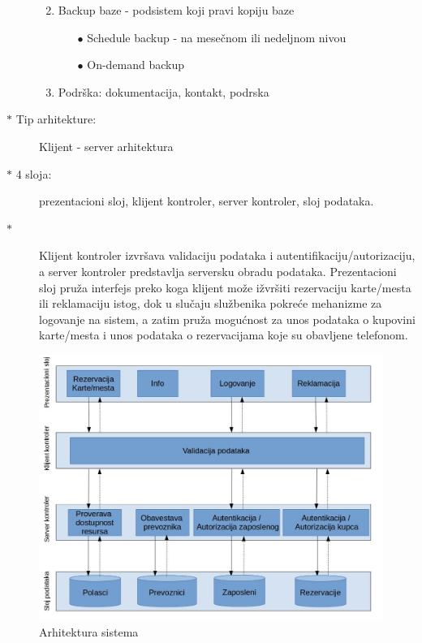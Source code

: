 \begin{description}
\begin{enumerate}
\begin{enumerate}
				\end{enumerate}
			\item Backup baze - podsistem koji pravi kopiju baze
				\begin{enumerate}
					\item[$\bullet$] Schedule backup - na mese\v cnom ili nedeljnom nivou
					\item[$\bullet$] On-demand backup
				\end{enumerate}
			\item Podr\v ska: dokumentacija, kontakt, podrska
		\end{enumerate}
	\item[$\ast$ Tip arhitekture:] Klijent - server arhitektura
	\item[$\ast$ 4 sloja:] prezentacioni sloj, klijent kontroler, server kontroler, sloj podataka. 
	\item[$\ast$] Klijent kontroler izvr\v sava validaciju podataka i autentifikaciju/autorizaciju, a server kontroler predstavlja serversku obradu podataka. Prezentacioni sloj pru\v za interfejs preko koga klijent mo\v ze i\v zvr\v siti rezervaciju karte/mesta ili reklamaciju istog, dok u slu\v caju slu\v zbenika pokre\' ce mehanizme za logovanje na sistem, a zatim pru\v za mogu\' cnost za unos podataka o kupovini karte/mesta i unos podataka o rezervacijama koje su obavljene telefonom.
\end{description}

\begin{figure}[!htb] 
	\centering
	\includegraphics[width=1.2\linewidth]{"../Slike/arhitektura"}
	\caption{Arhitektura sistema}
	\label{fig:arhitektura}
\end{figure}

